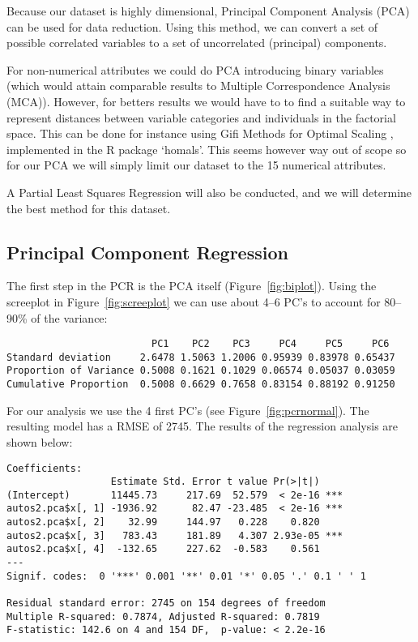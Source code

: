 Because our dataset is highly dimensional, Principal Component Analysis (PCA) can be used for data reduction. Using this method, we can convert a set of possible correlated variables to a set of uncorrelated (principal) components. 

For non-numerical attributes we could do PCA introducing binary variables (which would attain comparable results to Multiple Correspondence Analysis (MCA)). However, for betters results we would have to  to find a suitable way to represent distances between variable categories and individuals in the factorial space. This can be done for instance using Gifi Methods for Optimal Scaling \cite{gifi}, implemented in the R package `homals'. This seems however way out of scope so for our PCA we will simply limit our dataset to the 15 numerical attributes.

A Partial Least Squares Regression will also be conducted, and we will determine the best method for this dataset.

\subsection{Principal Component Regression}
The first step in the PCR is the PCA itself (Figure~\ref{fig:biplot}).
Using the screeplot in Figure~\ref{fig:screeplot} we can use about 4--6 PC's to account for 80--90\% of the variance:
\begin{verbatim}
                         PC1    PC2    PC3     PC4     PC5     PC6 
Standard deviation     2.6478 1.5063 1.2006 0.95939 0.83978 0.65437
Proportion of Variance 0.5008 0.1621 0.1029 0.06574 0.05037 0.03059
Cumulative Proportion  0.5008 0.6629 0.7658 0.83154 0.88192 0.91250
\end{verbatim}

For our analysis we use the 4 first PC's (see Figure~\ref{fig:pcrnormal}). The resulting model has a RMSE of 2745. The results of the regression analysis are shown below:
\begin{verbatim}
Coefficients:
                  Estimate Std. Error t value Pr(>|t|)
(Intercept)       11445.73     217.69  52.579  < 2e-16 ***
autos2.pca$x[, 1] -1936.92      82.47 -23.485  < 2e-16 ***
autos2.pca$x[, 2]    32.99     144.97   0.228    0.820
autos2.pca$x[, 3]   783.43     181.89   4.307 2.93e-05 ***
autos2.pca$x[, 4]  -132.65     227.62  -0.583    0.561
---
Signif. codes:  0 '***' 0.001 '**' 0.01 '*' 0.05 '.' 0.1 ' ' 1 

Residual standard error: 2745 on 154 degrees of freedom
Multiple R-squared: 0.7874,	Adjusted R-squared: 0.7819
F-statistic: 142.6 on 4 and 154 DF,  p-value: < 2.2e-16
\end{verbatim}

